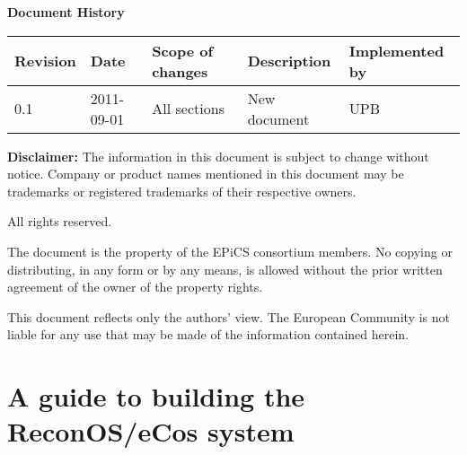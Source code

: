 \documentclass[DIV15,a4paper]{scrartcl}
\begin{document}
\begin{titlepage}
\newpage

\begin{center}

{\large\textbf{Document History}}

\vspace{1ex}

\begin{tabular}{llp{3cm}p{4cm}p{3cm}}
	\toprule
	\textbf{Revision} & \textbf{Date} & \textbf{Scope of changes} & \textbf{Description}       & \textbf{Implemented by} \\
	\midrule
	0.1               & 2011-09-01    & All sections             & New document                & UPB           \\
	
\bottomrule
\end{tabular}

\vspace{1cm}

\end{center}

\vspace{1cm}

\textbf{Disclaimer:} The information in this document is subject to change without notice. Company or product names mentioned in this document may be trademarks or registered trademarks of their respective owners. 

\begin{center}
All rights reserved. 
\end{center}

The document is the property of the EPiCS consortium members. No copying or distributing, in any form or by any means, is allowed without the prior written agreement of the owner of the property rights.

This document reflects only the authors' view. The European Community is not liable for any use that may be made of the information contained herein.

\end{titlepage}

\tableofcontents

\newpage

\section{A guide to building the ReconOS/eCos system} \label{sec:guide_ecos}
\end{document}
